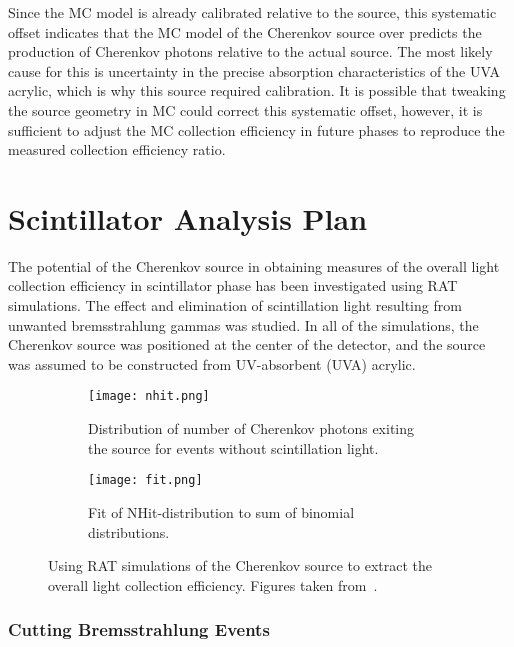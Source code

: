 Since the MC model is already calibrated relative to the \N source, this systematic offset indicates that the MC model of the Cherenkov source over predicts the production of Cherenkov photons relative to the actual source.
The most likely cause for this is uncertainty in the precise absorption characteristics of the UVA acrylic, which is why this source required calibration.
It is possible that tweaking the source geometry in MC could correct this systematic offset, however, it is sufficient to adjust the MC collection efficiency in future phases to reproduce the measured collection efficiency ratio.


\section{Scintillator Analysis Plan}
The potential of the Cherenkov source in obtaining measures of the overall light collection efficiency in scintillator phase has been investigated using RAT simulations. 
The effect and elimination of scintillation light resulting from unwanted bremsstrahlung gammas was studied.  
In all of the simulations, the Cherenkov source was positioned at the center of the detector, and the source was assumed to be constructed from UV-absorbent (UVA) acrylic.
 
 \begin{figure}
 \begin{subfigure}{.48\textwidth}
   \texttt{[image: nhit.png]}
   \caption{Distribution of number of Cherenkov photons exiting the source for events without scintillation light.}
   \label{fig:nphotons}
 \end{subfigure}
 \hspace{0.5cm}
 \begin{subfigure}{.48\textwidth}
   \texttt{[image: fit.png]}
   \caption{Fit of NHit-distribution to sum of binomial distributions.}
   \label{fig:fit}
 \end{subfigure}
 \caption{Using RAT simulations of the Cherenkov source to extract the overall light collection efficiency. Figures taken from~\cite{Heintzelman:2013}. }
 \label{fig:heintzelman-plots}
 \end{figure}
 
\subsubsection{Cutting Bremsstrahlung Events}

